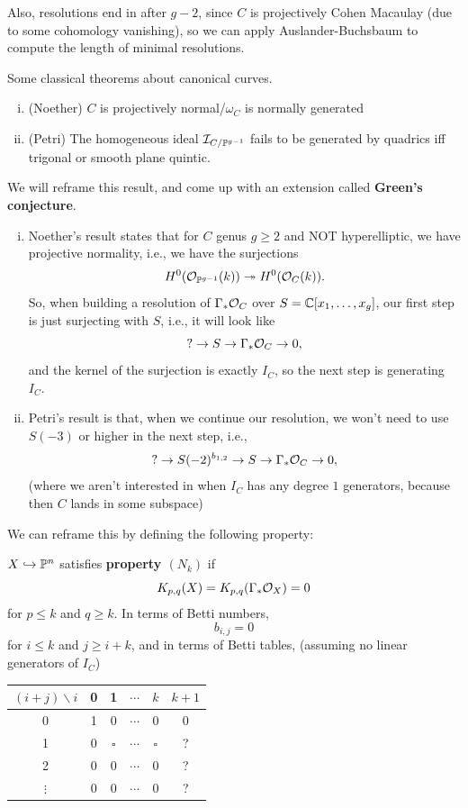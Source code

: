 \documentclass[12pt]{article}
\begin{document}
Also, resolutions end in after $g-2$, since $C$ is projectively Cohen Macaulay (due to some cohomology vanishing), so we can apply Auslander-Buchsbaum to compute the length of minimal resolutions.


Some classical theorems about canonical curves.
\begin{thm}
    \begin{enumerate}[(i)]
        \item (Noether) $C$ is projectively normal/$\omega_C$ is normally generated
        \item (Petri) The homogeneous ideal $\cI_{C/\P^{g-1}}$ fails to be generated by quadrics iff trigonal or smooth plane quintic.
    \end{enumerate}
\end{thm}

We will reframe this result, and come up with an extension called \textbf{Green's conjecture}.
\begin{enumerate}[(i)]
    \item Noether's result states that for $C$ genus $g\geq 2$ and NOT hyperelliptic, we have projective normality, i.e., we have the surjections
    \[H^0(\cO_{\P^{g-1}}(k)) \twoheadrightarrow H^0(\cO_C(k)).\]
    So, when building a resolution of $\Gamma_* \cO_C$ over $S=\C[x_1,\dots,x_g]$, our first step is just surjecting with $S$, i.e., it will look like
    \[? \to S \to \Gamma_* \cO_C \to 0,\]
    and the kernel of the surjection is exactly $I_C$, so the next step is generating $I_C$.

    \item Petri's result is that, when we continue our resolution, we won't need to use $S(-3)$ or higher in the next step, i.e.,
    \[? \to S(-2)^{b_{1,2}} \to S \to \Gamma_* \cO_C \to 0,\]
    (where we aren't interested in when $I_C$ has any degree $1$ generators, because then $C$ lands in some subspace)
\end{enumerate}

We can reframe this by defining the following property:
\begin{defn}
    $X\hookrightarrow \P^n$ satisfies \textbf{property $(N_k)$} if
    \[K_{p,q}(X) = K_{p,q}(\Gamma_*\cO_X) = 0\]
    for $p\leq k$ and $q\geq k$. In terms of Betti numbers,
    \[b_{i,j} = 0\]
    for $i\leq k$ and $j\geq i+k$, and in terms of Betti tables, (assuming no linear generators of $I_C$)
    \begin{center}
    \begin{tabular}{c|c c c c c}
        $(i+j)\backslash i$ & 0 & 1 & $\cdots$ & $k$ & $k+1$ \\\hline
        0        & 1 & 0        & $\cdots$         & 0         & 0\\
        1        & 0 & $\square$   & $\cdots$  & $\square$    & ?\\
        2        & 0 & 0        & $\cdots$         & 0         & ?\\
        $\vdots$ & 0 & 0        & $\cdots$         & 0         & ?
    \end{tabular}
    \end{center}
\end{defn}
\end{document}

